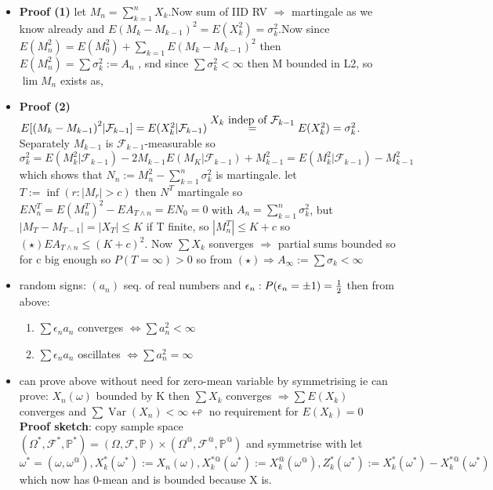 \documentclass[10pt,landscape,a4paper]{article}
\newcommand{\myFF}{\mathcal{F}}
\newcommand\myeq[1]{\stackrel{{\normalfont\mbox{#1}}}{ = }}
\newcommand{\Var}{ \operatorname{Var} }
\begin{document}
\begin{multicols*}{3}
\begin{spacing}{0.5}
\begin{itemize}
\item \textbf{Proof (1)} let $M_n=\sum_{k=1}^n X_k$.Now sum of IID RV $\Rightarrow$ martingale as we know already and $E{(M_k-M_{k-1})}^2=E(X_k^2)=\sigma_k^2$.Now since $E(M_n^2)=E(M_0^2) + \sum_{k=1} E{(M_k-M_{k-1})}^2 $ then $E(M_n^2)=\sum \sigma_k^2 := A_n$ , snd since $\sum \sigma_k^2 < \infty$ then M bounded in L2, so $\lim M_n$ exists as, 

\item \textbf{Proof (2)} $E [ {(M_k-M_{k-1})}^2 | \myFF_{k-1}] = E (X_k^2 | \myFF_{k-1}) \myeq{$X_k$ indep of $\myFF_{k-1}$} E(X_k^2) = \sigma_k^2$. Separately $M_{k-1}$ is $\myFF_{k-1}$-measurable so $\sigma_k^2=E(M_k^2|\myFF_{k-1}) - 2 M_{k-1}E(M_K|\myFF_{k-1}) + M_{k-1}^2 = E(M_k^2|\myFF_{k-1}) - M_{k-1}^2$ which shows that $N_n:=M_n^2-\sum_{k=1}^n \sigma_k^2$ is martingale. let $T:= \inf (r:|M_r|>c)$ then $N^T$ martingale so $EN_n^T=E{(M_n^T)}^2-EA_{T \wedge n}=EN_0=0$ with $A_n=\sum_{k=1}^n \sigma_k^2$, but $|M_T-M_{T-1}|=|X_T| \le K$ if T finite, so $|M_n^T| \le K+c$ so $ (\star) EA_{T \wedge n} \le {(K+c)}^2$. Now $\sum X_k$ sonverges $\Rightarrow $ partial sums bounded so for c big enough so $P(T=\infty)>0$ so from $(\star) \Rightarrow A_{\infty} := \sum \sigma_k < \infty$ 

\item random signs: $(a_n)$ seq. of real numbers and $\epsilon_n : P(\epsilon_n = \pm 1) = {1 \over 2}$  then from above:
\begin{enumerate}
\item $\sum \epsilon_n a_n$ converges $\Leftrightarrow \sum a_n^2 < \infty$

\item $\sum \epsilon_n a_n $ oscillates $\Leftrightarrow \sum a_n^2 = \infty$
\end{enumerate}

\item can prove above without need for zero-mean variable by symmetrising ie can prove: $X_n(\omega)$ bounded by K then $\sum X_k$ converges $\Rightarrow \sum E(X_k)$ converges and $\sum \Var (X_n) < \infty \looparrowleft$ no requirement for $E(X_k)=0$ \textbf{Proof sketch}: copy sample space $(\Omega^*,\myFF^*,\mathbb{P}^*)=(\Omega,\myFF,\mathbb{P}) \times (\Omega^@,\myFF^@,\mathbb{P}^@) $ and symmetrise with let $\omega^*=(\omega,\omega^@),X_k^*(\omega^*):= X_n(\omega),X_k^{*@}(\omega^*):=X_k^{@}(\omega^@) ,Z_k^*(\omega^*):=X_k^*(\omega^*)-X_k^{*@}(\omega^*)$ which now has 0-mean and is bounded because X is.


\end{itemize}
\end{spacing}
\end{multicols*}
\end{document}
